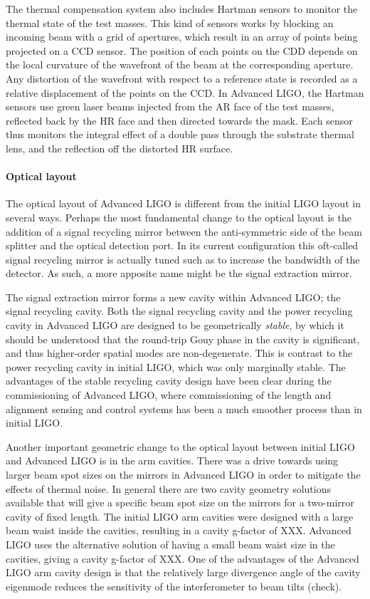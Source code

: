 The thermal compensation system also includes Hartman sensors to monitor the thermal state of the test masses. This kind of sensors works by blocking an incoming beam with a grid of apertures, which result in an array of points being projected on a CCD sensor. The position of each points on the CDD depends on the local curvature of the wavefront of the beam at the corresponding aperture. Any distortion of the wavefront with respect to a reference state is recorded as a relative displacement of the points on the CCD.
In Advanced LIGO, the Hartman sensors use green laser beams injected from the AR face of the test masses, reflected back by the HR face and then directed towards the mask. Each sensor thus monitors the integral effect of a double pass through the substrate thermal lens, and the reflection off the distorted HR surface.

\paragraph*{Optical layout}
The optical layout of Advanced LIGO is different from the initial LIGO layout in several ways. 
Perhaps the most fundamental change to the optical layout is the addition of a signal recycling 
mirror between the anti-symmetric side of the beam splitter and the optical detection port. 
In its current configuration this oft-called signal recycling mirror is actually tuned such as to 
increase the bandwidth of the detector. As such, a more apposite name might be the signal extraction mirror. 

The signal extraction mirror forms a new cavity within Advanced LIGO; the signal recycling cavity. 
Both the signal recycling cavity and the power recycling cavity in Advanced LIGO are designed to be 
geometrically \emph{stable}, by which it should be understood that the round-trip Gouy phase in the cavity 
is significant, and thus higher-order spatial modes are non-degenerate. 
This is contrast to the power recycling cavity in initial LIGO, which was only marginally stable. 
The advantages of the stable recycling cavity design have been clear during the commissioning of 
Advanced LIGO, where commissioning of the length and alignment sensing and control systems has 
been a much smoother process than in initial LIGO. 

Another important geometric change to the optical layout between initial LIGO and Advanced LIGO is 
in the arm cavities. There was a drive towards using larger beam spot sizes on the mirrors in Advanced 
LIGO in order to mitigate the effects of thermal noise. In general there are two cavity geometry solutions available 
that will give a specific beam spot size on the mirrors for a two-mirror cavity of fixed length. The initial LIGO 
arm cavities were designed with a large beam waist inside the cavities, resulting in a cavity g-factor of XXX. 
Advanced LIGO uses the alternative solution of having a small beam waist size in the cavities, giving a cavity g-factor of XXX. 
One of the advantages of the Advanced LIGO arm cavity design is that the relatively large divergence angle of the cavity 
eigenmode reduces the sensitivity of the interferometer to beam tilts (check). 

